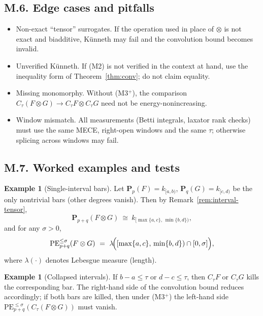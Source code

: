 \documentclass[11pt]{article}
\numberwithin{equation}{section}
\theoremstyle{plain}
\theoremstyle{definition}
\theoremstyle{remark}
\theoremstyle{plain}
\theoremstyle{definition}
\newcommand{\kk}{k}
\newcommand{\PE}{\mathrm{PE}}
\newcommand{\CT}{C_{\tau}}
\numberwithin{equation}{section}
\theoremstyle{definition}
\newtheorem{example}[theorem]{Example}
\numberwithin{equation}{section}
\theoremstyle{plain}
\theoremstyle{definition}
\theoremstyle{remark}
\providecommand{\n}{\unskip\space}
\begin{document}
\bigskip

\subsection*{M.6. Edge cases and pitfalls}

\begin{itemize}[leftmargin=2em]
  \item Non-exact ``tensor'' surrogates. If the operation used in place of \(\otimes\) is not exact and biadditive, K\"unneth may fail and the convolution bound becomes invalid.
  \item Unverified K\"unneth. If (M2) is not verified in the context at hand, use the inequality form of Theorem~\ref{thm:conv}; do not claim equality.
  \item Missing monomorphy. Without (M3$^+$), the comparison \(\CT(F\otimes G)\to \CT F\otimes \CT G\) need not be energy-nonincreasing.
  \item Window mismatch. All measurements (Betti integrals, laxator rank checks) must use the same MECE, right-open windows and the same \(\tau\); otherwise splicing across windows may fail.
\end{itemize}

\bigskip

\subsection*{M.7. Worked examples and tests}

\begin{example}[Single-interval bars]
Let \(\mathbf{P}_p(F)=\kk_{[a,b)}\), \(\mathbf{P}_q(G)=\kk_{[c,d)}\) be the only nontrivial bars (other degrees vanish). Then by Remark~\ref{rem:interval-tensor},
\[
  \mathbf{P}_{p+q}(F\otimes G)\ \cong\ \kk_{[\max\{a,c\},\,\min\{b,d\})},
\]
and for any \(\sigma>0\),
\[
  \PE_{p+q}^{\le \sigma}(F\otimes G)\n  \ =\ \lambda\!\Big([\max\{a,c\},\,\min\{b,d\})\cap[0,\sigma]\Big),
\]
where \(\lambda(\cdot)\) denotes Lebesgue measure (length).
\end{example}

\begin{example}[Collapsed intervals]
If \(b-a\le \tau\) or \(d-c\le \tau\), then \(\CT F\) or \(\CT G\) kills the corresponding bar. The right-hand side of the convolution bound reduces accordingly; if both bars are killed, then under (M3$^+$) the left-hand side \(\PE_{p+q}^{\le \sigma}(\CT(F\otimes G))\) must vanish.
\end{example}
\end{document}
